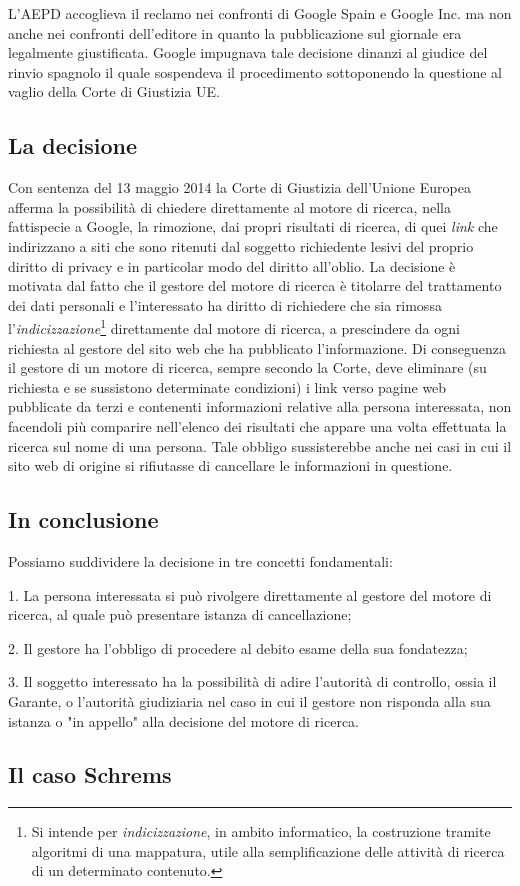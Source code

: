 L'AEPD accoglieva il reclamo nei confronti di Google Spain e Google Inc. ma non anche nei confronti dell'editore in quanto la pubblicazione sul giornale era legalmente giustificata.
Google impugnava tale decisione dinanzi al giudice del rinvio spagnolo il quale sospendeva il procedimento sottoponendo la questione al vaglio della Corte di Giustizia UE.
\subsection{La decisione}
Con sentenza del 13 maggio 2014 la Corte di Giustizia dell'Unione Europea afferma la possibilità di chiedere direttamente al motore di ricerca, nella fattispecie a Google, la rimozione, dai propri risultati di ricerca, di quei \textit{link} che indirizzano a siti che sono ritenuti dal soggetto richiedente lesivi del proprio diritto di privacy e in particolar modo del diritto all'oblio.
La decisione è motivata dal fatto che il gestore del motore di ricerca è titolarre del trattamento dei dati personali e l'interessato ha diritto di richiedere che sia rimossa l'\textit{indicizzazione}\footnote{Si intende per \textit{indicizzazione}, in ambito informatico, la costruzione tramite algoritmi di una mappatura, utile alla semplificazione delle attività di ricerca di un determinato contenuto.} direttamente dal motore di ricerca, a prescindere da ogni richiesta al gestore del sito web che ha pubblicato l'informazione. Di conseguenza il gestore di un motore di ricerca, sempre secondo la Corte, deve eliminare (su richiesta e se sussistono determinate condizioni) i link verso pagine web pubblicate da terzi e contenenti informazioni relative alla persona interessata, non facendoli più comparire nell'elenco dei risultati che appare una volta effettuata la ricerca sul nome di una persona. Tale obbligo sussisterebbe anche nei casi in cui il sito web di origine si rifiutasse di cancellare  le informazioni in questione.
\subsection{In conclusione}
Possiamo suddividere la decisione in tre concetti fondamentali:

1. La persona interessata si può rivolgere direttamente al gestore del motore di ricerca, al quale può presentare istanza di cancellazione;

2. Il gestore ha l'obbligo di procedere al debito esame della sua fondatezza;

3. Il soggetto interessato ha la possibilità di adire l'autorità di controllo, ossia il Garante, o l'autorità giudiziaria nel caso in cui il gestore non risponda alla sua istanza o "in appello" alla decisione del motore di ricerca.
\subsection{Il caso Schrems}


